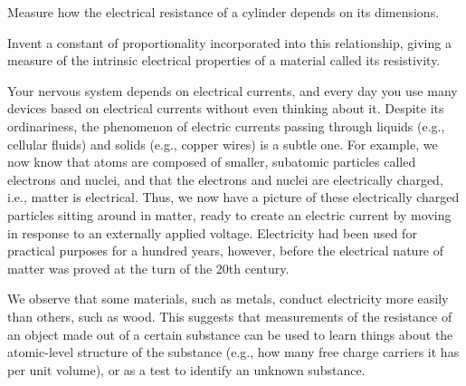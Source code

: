 \label{lab:resistivity}

\apparatus
{}

\begin{goals}

\item[] Measure how the electrical resistance of a cylinder depends on its dimensions.

\item[] Invent a constant of proportionality incorporated into this relationship, giving a measure of the intrinsic electrical properties of a material
called its resistivity.
\end{goals}

\introduction

Your nervous system depends on electrical currents, and
every day you use many devices based on electrical currents
without even thinking about it. Despite its ordinariness,
the phenomenon of electric currents passing through liquids
(e.g., cellular fluids) and solids (e.g., copper wires) is a
subtle one. For example, we now know that atoms are composed
of smaller, subatomic particles called electrons and nuclei,
and that the electrons and nuclei are electrically charged,
i.e., matter is electrical. Thus, we now have a picture of
these electrically charged particles sitting around in
matter, ready to create an electric current by moving in
response to an externally applied voltage. Electricity had
been used for practical purposes for a hundred years,
however, before the electrical nature of matter was proved
at the turn of the 20th century.

We observe that some materials, such as metals, conduct electricity
more easily than others, such as wood. This suggests that measurements
of the resistance of an object made out of a certain substance can be
used to learn things about the atomic-level structure of the substance
(e.g., how many free charge carriers it has per unit volume), or
as a test to identify an unknown substance.


